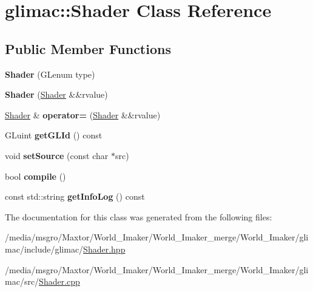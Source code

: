 \hypertarget{classglimac_1_1Shader}{}\section{glimac\+:\+:Shader Class Reference}
\label{classglimac_1_1Shader}
\subsection*{Public Member Functions}
\begin{DoxyCompactItemize}
\item 
\mbox{\label{classglimac_1_1Shader_a064a1d24851c1c405d3c912cff9521c4}} 
{\bfseries Shader} (G\+Lenum type)
\item 
\mbox{\label{classglimac_1_1Shader_a98bf794b782f89a7a5c859607e6dc62b}} 
{\bfseries Shader} (\hyperlink{classglimac_1_1Shader}{Shader} \&\&rvalue)
\item 
\mbox{\label{classglimac_1_1Shader_a0790eeb7a9fc154161bee6b78e287828}} 
\hyperlink{classglimac_1_1Shader}{Shader} \& {\bfseries operator=} (\hyperlink{classglimac_1_1Shader}{Shader} \&\&rvalue)
\item 
\mbox{\label{classglimac_1_1Shader_a46c21c4b6b9ee89426b458695897202e}} 
G\+Luint {\bfseries get\+G\+L\+Id} () const
\item 
\mbox{\label{classglimac_1_1Shader_a66701118e7f1d789a258936c82b32874}} 
void {\bfseries set\+Source} (const char $\ast$src)
\item 
\mbox{\label{classglimac_1_1Shader_a1e6c6814a6275dd698b3befdb89aa647}} 
bool {\bfseries compile} ()
\item 
\mbox{\label{classglimac_1_1Shader_aa0de6702041087187d8eca874000cfa6}} 
const std\+::string {\bfseries get\+Info\+Log} () const
\end{DoxyCompactItemize}


The documentation for this class was generated from the following files\+:\begin{DoxyCompactItemize}
\item 
/media/msgro/\+Maxtor/\+World\+\_\+\+Imaker/\+World\+\_\+\+Imaker\+\_\+merge/\+World\+\_\+\+Imaker/glimac/include/glimac/\hyperlink{Shader_8hpp}{Shader.\+hpp}\item 
/media/msgro/\+Maxtor/\+World\+\_\+\+Imaker/\+World\+\_\+\+Imaker\+\_\+merge/\+World\+\_\+\+Imaker/glimac/src/\hyperlink{Shader_8cpp}{Shader.\+cpp}\end{DoxyCompactItemize}
